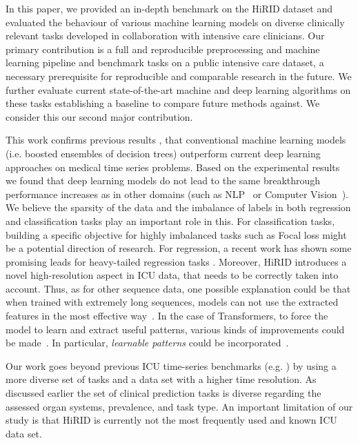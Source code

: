 \documentclass{article}
\begin{document}
In this paper, we provided an in-depth benchmark on the HiRID dataset and evaluated the behaviour of various machine learning models on diverse clinically relevant tasks developed in collaboration with intensive care clinicians. Our primary contribution is a full and reproducible preprocessing and machine learning pipeline and benchmark tasks on a public intensive care dataset, a necessary prerequisite for reproducible and comparable research in the future. We further evaluate current state-of-the-art machine and deep learning algorithms on these tasks establishing a baseline to compare future methods against. We consider this our second major contribution. 

This work confirms previous results \citep{hyland2020early}, that conventional machine learning models (i.e. boosted ensembles of decision trees) outperform current deep learning approaches on medical time series problems. Based on the experimental results we found that deep learning models do not lead to the same breakthrough performance increases as in other domains (such as NLP~\cite{devlin2018bert} or Computer Vision~\cite{dosovitskiy2020image}). We believe the sparsity of the data and the imbalance of labels in both regression and classification tasks play an important role in this. For classification tasks, building a specific objective for highly imbalanced tasks such as Focal loss \cite{lin2017focal} might be a potential direction of research. For regression, a recent work has shown some promising leads for heavy-tailed regression tasks \cite{yang2021delving}.
Moreover, HiRID introduces a novel high-resolution aspect in ICU data, that needs to be correctly taken into account. Thus, as for other sequence data, one possible explanation could be that when trained with extremely long sequences, models can not use the extracted features in the most effective way~\cite{zaheer2020big}. In the case of Transformers, to force the model to learn and extract useful patterns, various kinds of improvements could be made~\cite{tay2020efficient}. In particular, \textit{learnable patterns} could be incorporated~\cite{roy2021efficient}. 

Our work goes beyond previous ICU time-series benchmarks (e.g. \citep{harutyunyan2019multitask}) by using a more diverse set of tasks and a data set with a higher time resolution. As discussed earlier the set of clinical prediction tasks is diverse regarding the assessed organ systems, prevalence, and task type. An important limitation of our study is that HiRID is currently not the most frequently used and known ICU data set.
\end{document}

